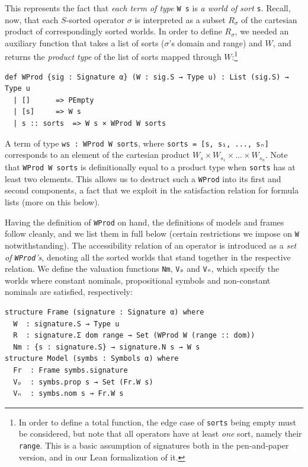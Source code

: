 \documentclass{easychair}
\theoremstyle{remark}
\begin{document}
This represents the fact that \textit{each term of type} \lstinline|W s| is \textit{a world of sort} \lstinline|s|. Recall, now, that each $S$-sorted operator $\sigma$ is interpreted as a subset $R_\sigma$ of the cartesian product of correspondingly sorted worlds. In order to define $R_\sigma$, we needed an auxiliary function that takes a list of sorts ($\sigma$'s domain and range) and $W$, and returns the \textit{product type} of the list of sorts mapped through $W$:\footnote{In order to define a total function, the edge case of \texttt{sorts} being empty must be considered, but note that all operators have at least \textit{one} sort, namely their \texttt{range}. This is a basic assumption of signatures both in the pen-and-paper version, and in our Lean formalization of it.}

\begin{lstlisting}
def WProd {sig : Signature α} (W : sig.S → Type u) : List (sig.S) → Type u
  | []      => PEmpty
  | [s]     => W s
  | s :: sorts  => W s × WProd W sorts
\end{lstlisting}

A term of type \lstinline|ws : WProd W sorts|, where \lstinline|sorts = [s, s₁, ..., sₙ]| corresponds to an element of the cartesian product $W_s \times W_{s_1} \times \dots \times W_{s_n}$. Note that \lstinline{WProd W sorts} is definitionally equal to a product type when \lstinline{sorts} has at least two elements. This allows us to destruct such a \lstinline{WProd} into its first and second components, a fact that we exploit in the satisfaction relation for formula lists (more on this below).

Having the definition of \lstinline{WProd} on hand, the definitions of models and frames follow cleanly, and we list them in full below (certain restrictions we impose on \lstinline{W} notwithstanding). The accessibility relation of an operator is introduced as a \textit{set of \lstinline{WProd}'s}, denoting all the sorted worlds that stand together in the respective relation. We define the valuation functions \lstinline{Nm}, \lstinline{Vₚ} and \lstinline{Vₙ}, which specify the worlds where constant nominals, propositional symbols and non-constant nominals are satisfied, respectively:
\begin{lstlisting}
structure Frame (signature : Signature α) where
  W  : signature.S → Type u
  R  : signature.Σ dom range → Set (WProd W (range :: dom))
  Nm : {s : signature.S} → signature.N s → W s
structure Model (symbs : Symbols α) where
  Fr  : Frame symbs.signature
  Vₚ  : symbs.prop s → Set (Fr.W s)
  Vₙ  : symbs.nom s → Fr.W s
\end{lstlisting}
\end{document}

